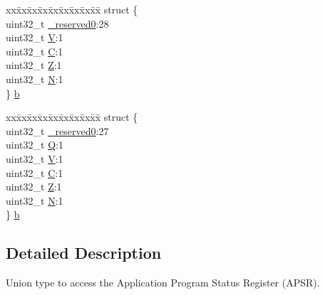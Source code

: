 \begin{DoxyCompactItemize}
\begin{tabbing}
\end{tabbing}\item 
\begin{tabbing}
xx\=xx\=xx\=xx\=xx\=xx\=xx\=xx\=xx\=\kill
struct \{\\
\>uint32\_t \hyperlink{unionAPSR__Type_afbce95646fd514c10aa85ec0a33db728}{\_reserved0}:28\\
\>uint32\_t \hyperlink{unionAPSR__Type_a8004d224aacb78ca37774c35f9156e7e}{V}:1\\
\>uint32\_t \hyperlink{unionAPSR__Type_a86e2c5b891ecef1ab55b1edac0da79a6}{C}:1\\
\>uint32\_t \hyperlink{unionAPSR__Type_a3b04d58738b66a28ff13f23d8b0ba7e5}{Z}:1\\
\>uint32\_t \hyperlink{unionAPSR__Type_a7e7bbba9b00b0bb3283dc07f1abe37e0}{N}:1\\
\} \hyperlink{unionAPSR__Type_a9d6e85a85f395a3b51e915420fe081de}{b}\\

\end{tabbing}\item 
\begin{tabbing}
xx\=xx\=xx\=xx\=xx\=xx\=xx\=xx\=xx\=\kill
struct \{\\
\>uint32\_t \hyperlink{unionAPSR__Type_afbce95646fd514c10aa85ec0a33db728}{\_reserved0}:27\\
\>uint32\_t \hyperlink{unionAPSR__Type_a22d10913489d24ab08bd83457daa88de}{Q}:1\\
\>uint32\_t \hyperlink{unionAPSR__Type_a8004d224aacb78ca37774c35f9156e7e}{V}:1\\
\>uint32\_t \hyperlink{unionAPSR__Type_a86e2c5b891ecef1ab55b1edac0da79a6}{C}:1\\
\>uint32\_t \hyperlink{unionAPSR__Type_a3b04d58738b66a28ff13f23d8b0ba7e5}{Z}:1\\
\>uint32\_t \hyperlink{unionAPSR__Type_a7e7bbba9b00b0bb3283dc07f1abe37e0}{N}:1\\
\} \hyperlink{unionAPSR__Type_a598a04a982e979ecc0d55fc6c1d4a2d6}{b}\\

\end{tabbing}\end{DoxyCompactItemize}


\subsection{Detailed Description}
Union type to access the Application Program Status Register (A\+P\+SR). 

